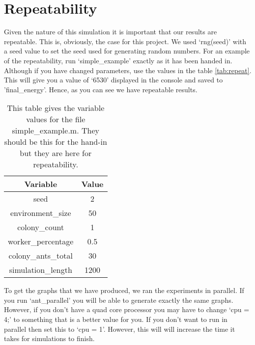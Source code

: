 \section{Repeatability}

Given the nature of this simulation it is important that our results are repeatable. This is, obviously, the case for this project. We used `rng(seed)' with a seed value to set the seed used for generating random numbers. For an example of the repeatability, run `simple\_example' exactly as it has been handed in. Although if you have changed parameters, use the values in the table \ref{tab:repeat}. This will give you a value of `6530' displayed in the console and saved to 'final\_energy'. Hence, as you can see we have repeatable results.\par

\begin{table}[htb]
\centering
\caption{This table gives the variable values for the file simple\_example.m. They should be this for the hand-in but they are here for repeatability.}
\label{repeat}
\begin{tabular}{@{}cc@{}}
\toprule
Variable          & Value \\ \midrule
seed              & 2     \\ \midrule
environment\_size  & 50    \\ \midrule
colony\_count      & 1     \\ \midrule
worker\_percentage & 0.5   \\ \midrule
colony\_ants\_total & 30    \\ \midrule
simulation\_length & 1200  \\ \bottomrule
\end{tabular}
\end{table}


To get the graphs that we have produced, we ran the experiments in parallel. If you run `ant\_parallel' you will be able to generate exactly the same graphs. However, if you don't have a quad core processor you may have to change `cpu = 4;' to something that is a better value for you. If you don't want to run in parallel then set this to `cpu = 1'. However, this will will increase the time it takes for simulations to finish.\par